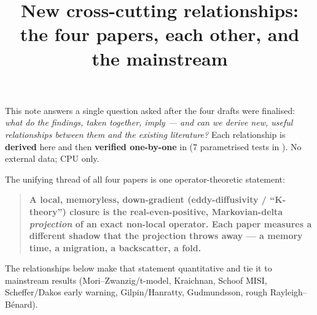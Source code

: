 \documentclass[11pt]{article}
\title{New cross-cutting relationships: the four papers, each other, and the mainstream}
\author{}
\date{}
\begin{document}
\maketitle

This note answers a single question asked after the four drafts were finalised: \emph{what do the findings, taken together, imply — and can we derive new, useful relationships between them and the existing literature?} Each relationship is \textbf{derived} here and then \textbf{verified one-by-one} in  (7 parametrised tests in ). No external data; CPU only.


The unifying thread of all four papers is one operator-theoretic statement:


\begin{quote}
\textbf{A local, memoryless, down-gradient (eddy-diffusivity / ``K-theory'') closure is the real-even-positive, Markovian-delta \emph{projection} of an exact non-local operator. Each paper measures a different shadow that the projection throws away — a memory time, a migration, a backscatter, a fold.}
\end{quote}


The relationships below make that statement quantitative and tie it to mainstream results (Mori–Zwanzig/t-model, Kraichnan, Schoof MISI, Scheffer/Dakos early warning, Gilpin/Hanratty, Gudmundsson, rough Rayleigh–Bénard).
\end{document}
